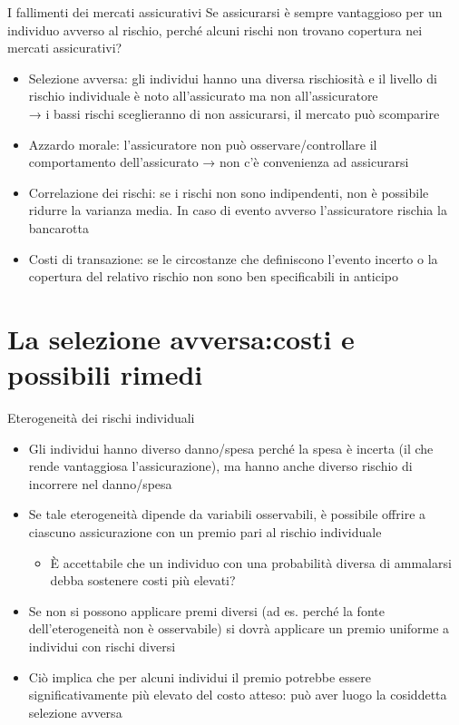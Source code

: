 \documentclass[aspectratio=64,11pt]{beamer}
\begin{document}
\begin{frame}{I fallimenti dei mercati assicurativi}
Se assicurarsi è sempre vantaggioso per un individuo avverso al rischio, perché alcuni rischi non trovano copertura nei mercati assicurativi?

\begin{itemize}
\item \alert{Selezione avversa}: gli individui hanno una diversa rischiosità e il
livello di rischio individuale è noto all'assicurato ma non all'assicuratore\\[0pt]
→ i bassi rischi sceglieranno di non assicurarsi, il mercato può scomparire
\item \alert{Azzardo morale}: l'assicuratore non può osservare/controllare il
comportamento dell'assicurato
→ non c'è convenienza ad assicurarsi
\item \alert{Correlazione dei rischi}: se i rischi non sono indipendenti, non è
possibile ridurre la varianza media. In caso di evento avverso
l'assicuratore rischia la bancarotta
\item \alert{Costi di transazione}: se le circostanze che definiscono l'evento incerto o
la copertura del relativo rischio non sono ben specificabili in anticipo
\end{itemize}
\end{frame}

\section{La selezione avversa:\newline costi e possibili rimedi}

\begin{frame}{Eterogeneità dei rischi individuali}
\begin{itemize}
\item Gli individui hanno diverso danno/spesa perché la spesa è incerta (il che
rende vantaggiosa l'assicurazione), ma hanno anche diverso rischio di
incorrere nel danno/spesa
\item Se tale eterogeneità dipende da variabili osservabili, è possibile offrire a
ciascuno assicurazione con un premio pari al rischio individuale
\begin{itemize}
\item È accettabile che un individuo con una probabilità diversa di ammalarsi
debba sostenere costi più elevati?
\end{itemize}
\item Se non si possono applicare premi diversi (ad es. perché la fonte
dell'eterogeneità non è osservabile) si dovrà applicare un premio uniforme a
individui con rischi diversi
\item Ciò implica che per alcuni individui il premio potrebbe essere
significativamente più elevato del costo atteso: può aver luogo la
cosiddetta \alert{selezione avversa}
\end{itemize}
\end{frame}
\end{document}
